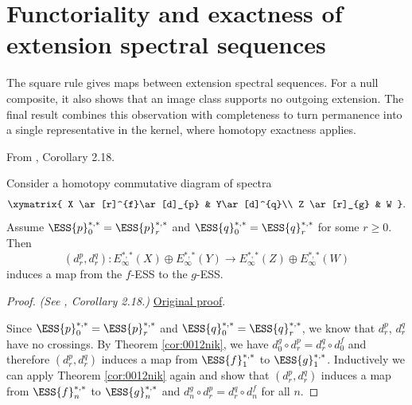 





\section{Functoriality and exactness of extension spectral sequences}

The square rule gives maps between extension spectral sequences.
For a null composite, it also shows that an image class supports no
outgoing extension. The final result combines this observation with
completeness to turn permanence into a single representative in the
kernel, where homotopy exactness applies.

\begin{corollary}
\label{paper:2.18}
From \cite{LWX126}, Corollary 2.18.\par

\label{cor:e7b20ae2}
    Consider a homotopy commutative diagram of spectra
    $$\xymatrix{
    X \ar[r]^{f}\ar[d]_{p} & Y\ar[d]^{q}\\
    Z \ar[r]_{g} & W
    }.$$
    Assume $\ESS{p}_0^{*,*}=\ESS{p}_r^{*,*}$ and $\ESS{q}_0^{*,*}=\ESS{q}_r^{*,*}$ for some $r\ge 0$. Then
    $$(d^p_r, d^q_r): E_\infty^{*,*}(X)\oplus E_\infty^{*,*}(Y)\to E_\infty^{*,*}(Z)\oplus E_\infty^{*,*}(W)$$
    induces a map from the $f$-ESS to the $g$-ESS.


\end{corollary}
\begin{proof}
\textit{(See \cite{LWX126}, Corollary 2.18.)} \href{paper/main.tex.html#L628}{Original proof}.

Since $\ESS{p}_0^{*,*}=\ESS{p}_r^{*,*}$ and $\ESS{q}_0^{*,*}=\ESS{q}_r^{*,*}$, we know that $d^p_r$, $d^q_r$ have no crossings. By Theorem \ref{cor:0012nik}, we have $d^g_0\circ d^p_r = d^q_r\circ d^f_0$ and therefore $(d^p_r, d^q_r)$ induces a map from $\ESS{f}_1^{*,*}$ to $\ESS{g}_1^{*,*}$. Inductively we can apply Theorem \ref{cor:0012nik} again and show that $(d^p_r, d^q_r)$ induces a map from $\ESS{f}_n^{*,*}$ to $\ESS{g}_n^{*,*}$ and $d^g_n\circ d^p_r = d^q_r\circ d^f_n$ for all $n$.
\end{proof}

